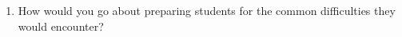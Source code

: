 \documentclass[12pt, letterpaper]{article}
\begin{document}
\begin{enumerate}
\item How would you go about preparing students for the common difficulties they would encounter?








\end{enumerate}
\end{document}
